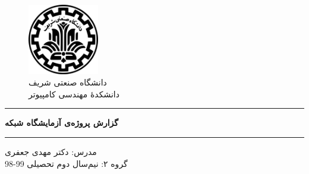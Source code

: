 \begin{center}
	\null
	\vspace{1cm}
\begin{figure}[H]
	\centering
	\includegraphics[width=0.275\textwidth]{sharif-logo-fa.png}
	\caption*{دانشگاه صنعتی شریف\\
		\large{
	دانشکدهٔ مهندسی کامپیوتر}
}
\end{figure}
\vspace{1 cm}
\hrule
\vspace{.5cm}
\fontsize{28}{28}\textbf{
گزارش پروژه‌ی
آزمایشگاه شبکه
}
\\
\vspace{.5cm}
\hrule
\vspace{1cm}
\fontsize{16}{16}\textbf{
}
\vspace{1.5cm}
\normalfont
\large{
مدرس:
دکتر ‌مهدی جعفری\\}
\vspace{2 cm}
\fontsize{13}{13}
گروه ۲:
\fontsize{14}{14}{\selectfont
	\makecell{\teamMemOne\\ \stdIdOne}
	\makecell{\teamMemTwo\\ \stdIdTwo}
	\makecell{\teamMemThree\\ \stdIdThree}
}
\normalsize
\vfill{نیم‌سال دوم تحصیلی 99-98}
\end{center}
\thispagestyle{empty}